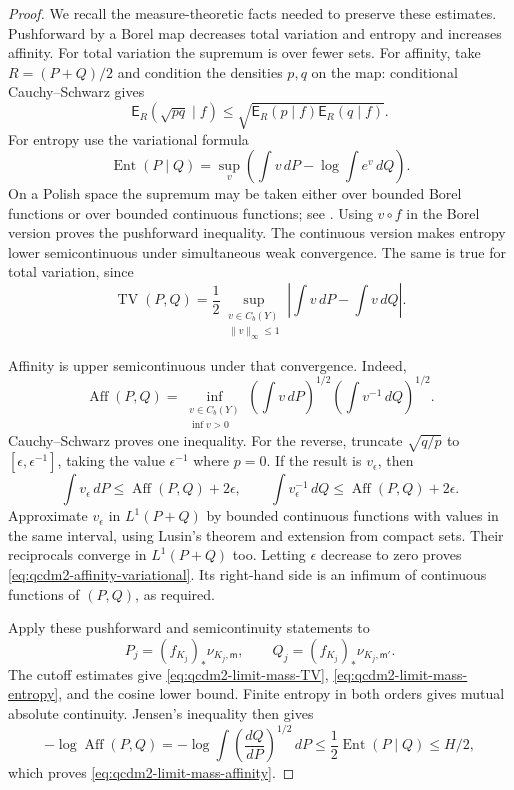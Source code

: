 \documentclass[11pt,letterpaper,reqno]{amsart}
\theoremstyle{definition}
\theoremstyle{remark}
\begin{document}
\begin{proof}
We recall the measure-theoretic facts needed to preserve
these estimates. Pushforward by a Borel map decreases total
variation and entropy and increases affinity. For total
variation the supremum is over fewer sets. For affinity,
take $R=(P+Q)/2$ and condition the densities $p,q$ on the
map: conditional Cauchy--Schwarz gives
\[
 \mathsf E_R(\sqrt{pq}\mid f)
    \le\sqrt{\mathsf E_R(p\mid f)\mathsf E_R(q\mid f)}.
\]
For entropy use the variational formula
\begin{equation}\label{eq:qcdm2-entropy-variational}
 \operatorname{Ent}(P\mid Q)
  =\sup_v\left(\int v\,dP-\log\int e^v\,dQ\right).
\end{equation}
On a Polish space the supremum may be taken either over
bounded Borel functions or over bounded continuous functions;
see \cite[equation (1.1) and the following paragraph]{DM22}.
Using $v\circ f$ in the Borel version proves the pushforward
inequality. The continuous version makes entropy lower
semicontinuous under simultaneous weak convergence.
The same is true for total variation, since
\[
 \operatorname{TV}(P,Q)
   =\frac12\sup_{\substack{v\in C_b(Y)\\\|v\|_\infty\le1}}
                   \left|\int v\,dP-\int v\,dQ\right|.
\]

Affinity is upper semicontinuous under that convergence.
Indeed,
\begin{equation}\label{eq:qcdm2-affinity-variational}
 \operatorname{Aff}(P,Q)
 =\inf_{\substack{v\in C_b(Y)\\\inf v>0}}
          \left(\int v\,dP\right)^{1/2}
          \left(\int v^{-1}\,dQ\right)^{1/2}.
\end{equation}
Cauchy--Schwarz proves one inequality. For the reverse,
truncate $\sqrt{q/p}$ to $[\epsilon,\epsilon^{-1}]$,
taking the value $\epsilon^{-1}$ where $p=0$. If the result
is $v_\epsilon$, then
\[
 \int v_\epsilon\,dP\le\operatorname{Aff}(P,Q)+2\epsilon,
 \qquad
 \int v_\epsilon^{-1}\,dQ\le\operatorname{Aff}(P,Q)+2\epsilon.
\]
Approximate $v_\epsilon$ in $L^1(P+Q)$ by bounded continuous
functions with values in the same interval, using Lusin's
theorem and extension from compact sets. Their reciprocals
converge in $L^1(P+Q)$ too. Letting $\epsilon$ decrease to
zero proves \eqref{eq:qcdm2-affinity-variational}. Its
right-hand side is an infimum of continuous functions of
$(P,Q)$, as required.

Apply these pushforward and semicontinuity statements to
\[
 P_j=(f_{K_j})_*\nu_{K_j,\mathsf m},\qquad
 Q_j=(f_{K_j})_*\nu_{K_j,\mathsf m'}.
\]
The cutoff estimates
give \eqref{eq:qcdm2-limit-mass-TV},
\eqref{eq:qcdm2-limit-mass-entropy}, and the cosine lower
bound. Finite entropy in both orders gives mutual absolute
continuity. Jensen's inequality then gives
\[
 -\log\operatorname{Aff}(P,Q)
 =-\log\int\left(\frac{dQ}{dP}\right)^{1/2}\,dP
 \le\frac12\operatorname{Ent}(P\mid Q)\le H/2,
\]
which proves \eqref{eq:qcdm2-limit-mass-affinity}.


\end{proof}
\end{document}
